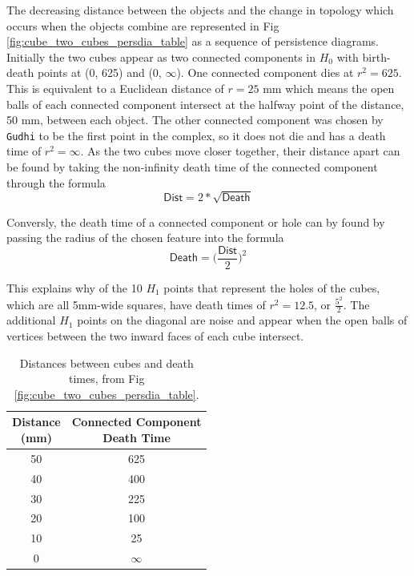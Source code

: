 \documentclass[ma]{uncgdissertationexp}
\theoremstyle{plain}
\theoremstyle{definition}
\theoremstyle{remark}
\begin{document}
\par The decreasing distance between the objects and the change in topology which occurs when the objects combine are represented in Fig \ref{fig:cube_two_cubes_persdia_table} as a sequence of persistence diagrams. Initially the two cubes appear as two connected components in $H_{0}$ with birth-death points at (0, 625) and (0, $\infty$). One connected component dies at $r^{2} = 625$. This is equivalent to a Euclidean distance of $r=25$ mm which means the open balls of each connected component intersect at the halfway point of the distance, 50 mm, between each object. The other connected component was chosen by \verb"Gudhi" to be the first point in the complex, so it does not die and has a death time of $r^2=\infty$. As the two cubes move closer together, their distance apart can be found by taking the non-infinity death time of the connected component through the formula 
\begin{equation}\label{eq:death_to_dist}
\mathsf{Dist} = 2*\sqrt{\mathsf{Death}}
\end{equation}
\par Conversly, the death time of a connected component or hole can by found by passing the radius of the chosen feature into the formula 
\begin{equation}\label{eq:dist_to_death}
\mathsf{Death} = \bigg(\frac{\mathsf{Dist}}{2}\bigg)^{2}
\end{equation}
\par This explains why of the 10 $H_{1}$ points that represent the holes of the cubes, which are all 5mm-wide squares, have death times of $r^{2}=12.5$, or $\frac{5^{2}}{2}$. The additional $H_{1}$ points on the diagonal are noise and appear when the open balls of vertices between the two inward faces of each cube intersect.
\begin{table}[H]
\centering
\begin{tabular}{|c|c|}
    \hline
    \makecell{Distance\\(mm)} & \makecell{Connected Component\\Death Time} \\
    \hline
    50 & 625 \\
    40 & 400 \\
    30 & 225 \\
    20 & 100 \\
    10 & 25 \\
    0 & $\infty$ \\
    \hline
\end{tabular}
\caption{Distances between cubes and death times, from Fig \ref{fig:cube_two_cubes_persdia_table}.}
\end{table}
\end{document}
